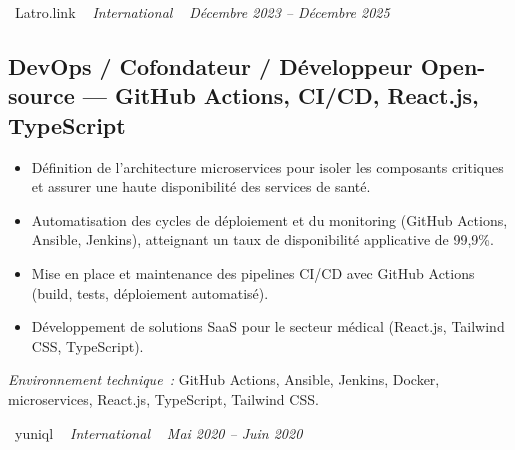 \documentclass[10pt,a4paper]{article}
\begin{document}
\vspace{10pt}

\noindent\textcolor{primary}{ \faBuilding\ Latro.link} \quad
\textit{ \small \textcolor{darkgray}{ \faMapMarker\ } International } \hfill
\textit{ \small \textcolor{darkgray}{ \faCalendar\ } Décembre 2023 -- Décembre 2025 }

\vspace{4pt}

\subsection*{DevOps / Cofondateur / Développeur Open-source --- GitHub Actions, CI/CD, React.js, TypeScript}
\color{darkgray}
\begin{itemize}
  \item Définition de l'architecture microservices pour isoler les composants critiques et assurer une haute disponibilité des services de santé.
  \item Automatisation des cycles de déploiement et du monitoring (GitHub Actions, Ansible, Jenkins), atteignant un taux de disponibilité applicative de 99,9\%.
  \item Mise en place et maintenance des pipelines CI/CD avec GitHub Actions (build, tests, déploiement automatisé).
  \item Développement de solutions SaaS pour le secteur médical (React.js, Tailwind CSS, TypeScript).
\end{itemize}
\textit{Environnement technique~:} GitHub Actions, Ansible, Jenkins, Docker, microservices, React.js, TypeScript, Tailwind CSS.

\vspace{10pt}

\noindent\textcolor{primary}{ \faBuilding\ yuniql} \quad
\textit{ \small \textcolor{darkgray}{ \faMapMarker\ } International } \hfill
\textit{ \small \textcolor{darkgray}{ \faCalendar\ } Mai 2020 -- Juin 2020 }

\vspace{4pt}
\end{document}
